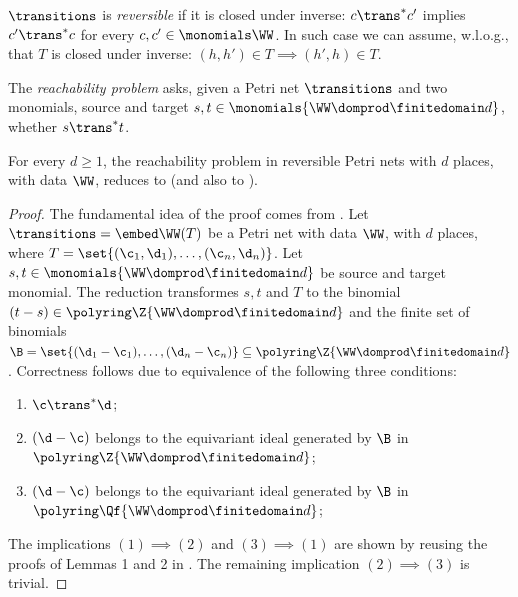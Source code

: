 $\transitions$ is \emph{reversible} if it is closed under inverse:
$c\trans^* c'$ implies $c' \trans^* c$ for every $c,c'\in\monomials \WW$.
In such case we can assume, w.l.o.g., that $T$ is closed under inverse:
$(h, h')\in T \implies (h',h) \in T$.

The \emph{reachability problem} asks, given a Petri net $\transitions$ %
and two monomials, source and target $s, t\in\monomials {\WW\domprod \finitedomain d}$,
whether $s \trans^* t$.


\begin{theorem}\label{thm:red reach}
For every $d\geq 1$,
the reachability problem in reversible Petri nets with $d$ places,
with data $\WW$, 
reduces to
(and also to
).
\end{theorem}
%
%
\begin{proof}
The fundamental idea of the proof comes from \cite{MayrMeyer82}.
Let $\transitions = \embed \WW(T)$ be a Petri net with data $\WW$, with $d$ places,
where
$T=\set{(\c_1, \d_1), \ldots, (\c_n, \d_n)}$.
Let $s,t\in\monomials  {\WW\domprod \finitedomain d}$ be source and target monomial.
The reduction transformes $s, t$ and $T$ to
the binomial
$(t-s)\in\polyring \Z  {\WW\domprod \finitedomain d}$ and the finite set of binomials
$\B=\set{(\d_1 - \c_1), \ldots, (\d_n - \c_n)} \subseteq \polyring \Z  {\WW\domprod \finitedomain d}$.
Correctness follows due to equivalence
of the following three conditions:
\begin{enumerate}
\item $\c\trans^*\d$;
\item $(\d-\c)$ belongs to the equivariant ideal generated by $\B$ in $\polyring \Z  {\WW\domprod \finitedomain d}$;
\item $(\d-\c)$ belongs to the equivariant ideal generated by $\B$ in $\polyring \Qf  {\WW\domprod \finitedomain d}$;
\end{enumerate}
The implications $(1){\implies} (2)$ and $(3) {\implies} (1)$ are shown by %
reusing the proofs of Lemmas 1 and 2 in \cite{MayrMeyer82}. 
The remaining implication $(2){\implies} (3)$ is trivial.
\end{proof}

